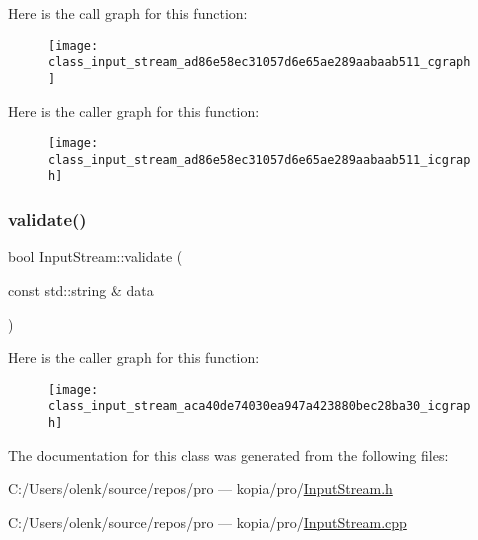 Here is the call graph for this function\+:
\nopagebreak
\begin{figure}[H]
\begin{center}
\leavevmode
\texttt{[image: class\_input\_stream\_ad86e58ec31057d6e65ae289aabaab511\_cgraph]}
\end{center}
\end{figure}
Here is the caller graph for this function\+:
\nopagebreak
\begin{figure}[H]
\begin{center}
\leavevmode
\texttt{[image: class\_input\_stream\_ad86e58ec31057d6e65ae289aabaab511\_icgraph]}
\end{center}
\end{figure}
\mbox{\label{class_input_stream_aca40de74030ea947a423880bec28ba30}} 
\subsubsection{\texorpdfstring{validate()}{validate()}}
{\footnotesize\ttfamily bool Input\+Stream\+::validate (\begin{DoxyParamCaption}\item[{const std\+::string \&}]{data }\end{DoxyParamCaption})}

Here is the caller graph for this function\+:
\nopagebreak
\begin{figure}[H]
\begin{center}
\leavevmode
\texttt{[image: class\_input\_stream\_aca40de74030ea947a423880bec28ba30\_icgraph]}
\end{center}
\end{figure}


The documentation for this class was generated from the following files\+:\begin{DoxyCompactItemize}
\item 
C\+:/\+Users/olenk/source/repos/pro — kopia/pro/\mbox{\hyperlink{_input_stream_8h}{Input\+Stream.\+h}}\item 
C\+:/\+Users/olenk/source/repos/pro — kopia/pro/\mbox{\hyperlink{_input_stream_8cpp}{Input\+Stream.\+cpp}}\end{DoxyCompactItemize}
